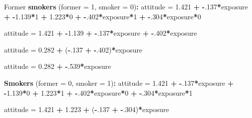 \documentclass[a4paper]{book}
\newenvironment{Shaded}{\begin{snugshade}}{\end{snugshade}}
\newcommand{\KeywordTok}[1]{\textcolor[rgb]{0,0,0}{\textbf{#1}}}
\newcommand{\DataTypeTok}[1]{\textcolor[rgb]{0,0,0}{#1}}
\newcommand{\DecValTok}[1]{\textcolor[rgb]{0.00,0.00,0.00}{#1}}
\newcommand{\FloatTok}[1]{\textcolor[rgb]{0.00,0.00,0.00}{#1}}
\newcommand{\StringTok}[1]{\textcolor[rgb]{0.00,0.00,0.00}{#1}}
\newcommand{\OperatorTok}[1]{\textcolor[rgb]{0.00,0.00,0.00}{\textbf{#1}}}
\newcommand{\NormalTok}[1]{#1}
\theoremstyle{definition}
\theoremstyle{definition}
\theoremstyle{definition}
\theoremstyle{remark}
\begin{document}
\begin{Shaded}
\begin{Highlighting}[]
\NormalTok{Former }\KeywordTok{smokers}\NormalTok{ (}\DataTypeTok{former =} \DecValTok{1}\NormalTok{, }\DataTypeTok{smoker =} \DecValTok{0}\NormalTok{)}\OperatorTok{:}\StringTok{  }
\StringTok{  }
\NormalTok{attitude =}\StringTok{ }\FloatTok{1.421} \OperatorTok{+}\StringTok{ }\OperatorTok{-}\NormalTok{.}\DecValTok{137}\OperatorTok{*}\NormalTok{exposure }\OperatorTok{+}\StringTok{ }\OperatorTok{-}\FloatTok{1.139}\OperatorTok{*}\DecValTok{1} \OperatorTok{+}\StringTok{ }\FloatTok{1.223}\OperatorTok{*}\DecValTok{0} \OperatorTok{+}\StringTok{ }\OperatorTok{-}\NormalTok{.}\DecValTok{402}\OperatorTok{*}\NormalTok{exposure}\OperatorTok{*}\DecValTok{1} \OperatorTok{+}\StringTok{ }
\StringTok{  }\OperatorTok{-}\NormalTok{.}\DecValTok{304}\OperatorTok{*}\NormalTok{exposure}\OperatorTok{*}\DecValTok{0}  
  
\NormalTok{attitude =}\StringTok{ }\FloatTok{1.421} \OperatorTok{+}\StringTok{ }\OperatorTok{-}\FloatTok{1.139} \OperatorTok{+}\StringTok{ }\OperatorTok{-}\NormalTok{.}\DecValTok{137}\OperatorTok{*}\NormalTok{exposure }\OperatorTok{+}\StringTok{ }\OperatorTok{-}\NormalTok{.}\DecValTok{402}\OperatorTok{*}\NormalTok{exposure  }
  
\NormalTok{attitude =}\StringTok{ }\FloatTok{0.282} \OperatorTok{+}\StringTok{ }\NormalTok{(}\OperatorTok{-}\NormalTok{.}\DecValTok{137} \OperatorTok{+}\StringTok{ }\OperatorTok{-}\NormalTok{.}\DecValTok{402}\NormalTok{)}\OperatorTok{*}\NormalTok{exposure  }
  
\NormalTok{attitude =}\StringTok{ }\FloatTok{0.282} \OperatorTok{+}\StringTok{ }\OperatorTok{-}\NormalTok{.}\DecValTok{539}\OperatorTok{*}\NormalTok{exposure  }
  
\KeywordTok{Smokers}\NormalTok{ (}\DataTypeTok{former =} \DecValTok{0}\NormalTok{, }\DataTypeTok{smoker =} \DecValTok{1}\NormalTok{)}\OperatorTok{:}\StringTok{  }
\StringTok{  }
\NormalTok{attitude =}\StringTok{ }\FloatTok{1.421} \OperatorTok{+}\StringTok{ }\OperatorTok{-}\NormalTok{.}\DecValTok{137}\OperatorTok{*}\NormalTok{exposure }\OperatorTok{+}\StringTok{ }\OperatorTok{-}\FloatTok{1.139}\OperatorTok{*}\DecValTok{0} \OperatorTok{+}\StringTok{ }\FloatTok{1.223}\OperatorTok{*}\DecValTok{1} \OperatorTok{+}\StringTok{ }\OperatorTok{-}\NormalTok{.}\DecValTok{402}\OperatorTok{*}\NormalTok{exposure}\OperatorTok{*}\DecValTok{0} \OperatorTok{+}\StringTok{ }
\StringTok{  }\OperatorTok{-}\NormalTok{.}\DecValTok{304}\OperatorTok{*}\NormalTok{exposure}\OperatorTok{*}\DecValTok{1}  
  
\NormalTok{attitude =}\StringTok{ }\FloatTok{1.421} \OperatorTok{+}\StringTok{ }\FloatTok{1.223} \OperatorTok{+}\StringTok{ }\NormalTok{(}\OperatorTok{-}\NormalTok{.}\DecValTok{137} \OperatorTok{+}\StringTok{ }\OperatorTok{-}\NormalTok{.}\DecValTok{304}\NormalTok{)}\OperatorTok{*}\NormalTok{exposure  }
  

\end{Highlighting}
\end{Shaded}
\end{document}
